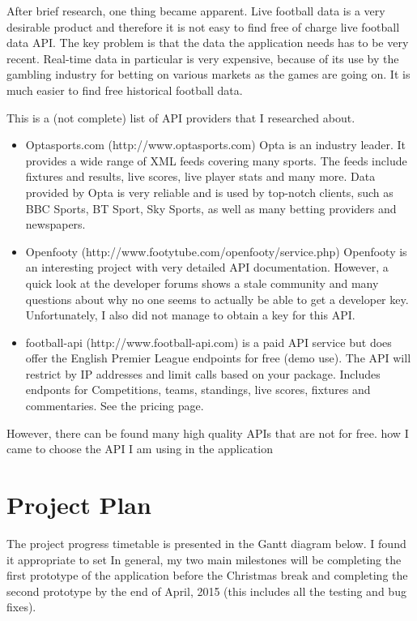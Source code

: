 	After brief research, one thing became apparent. Live football data is a very desirable product and therefore it is not easy to find free of charge live football data API.  The key problem is that the data the application needs has to be very recent. Real-time data in particular is very expensive, because of its use by the gambling industry for betting on various markets as the games are going on. It is much easier to find free historical football data.  
	
	This is a (not complete) list of API providers that I researched about.
	
	\begin{itemize}
		\item Optasports.com (http://www.optasports.com)
		Opta is an industry leader. It provides a wide range of XML feeds covering many sports. The feeds include fixtures and results, live scores, live player stats and many more. Data provided by Opta is very reliable and is used by top-notch clients, such as BBC Sports, BT Sport, Sky Sports, as well as many betting providers and newspapers.
		
		\item Openfooty (http://www.footytube.com/openfooty/service.php) 
		Openfooty is an interesting project with very detailed API documentation. However, a quick look at the developer forums shows a stale community and many questions about why no one seems to actually be able to get a developer key.	Unfortunately, I also did not manage to obtain a key for this API.	
		
		\item football-api (http://www.football-api.com)
	is a paid API service but does offer the English Premier League endpoints for free (demo use). The API will restrict by IP addresses and limit calls based on your package. 	Includes endponts for Competitions, teams, standings, live scores, fixtures and commentaries. See the pricing page.		
		
	\end{itemize}
	
However, there can be found many high quality APIs that are not for free. how I came to choose the API I am using in the application

\section{Project Plan}
\label{projectplan_req}
The project progress timetable is presented in the Gantt diagram below. I found it appropriate to set In general, my two main milestones will be completing the first prototype of the application before the Christmas break and completing the second prototype by the end of April, 2015 (this includes all the testing and bug fixes). 

